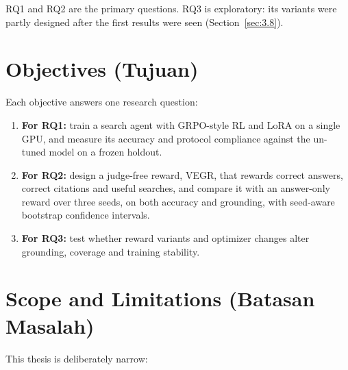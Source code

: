 RQ1 and RQ2 are the primary questions. RQ3 is exploratory: its variants
were partly designed after the first results were seen
(Section~\ref{sec:3.8}).

\section{Objectives (Tujuan)}\label{sec:1.3}

Each objective answers one research question:

\begin{enumerate}
\def\labelenumi{\arabic{enumi}.}
\tightlist
\item
  \textbf{For RQ1:} train a search agent with GRPO-style RL and LoRA on
  a single GPU, and measure its accuracy and protocol compliance against
  the un-tuned model on a frozen holdout.
\item
  \textbf{For RQ2:} design a judge-free reward, VEGR, that rewards
  correct answers, correct citations and useful searches, and compare it
  with an answer-only reward over three seeds, on both accuracy and
  grounding, with seed-aware bootstrap confidence intervals.
\item
  \textbf{For RQ3:} test whether reward variants and optimizer changes
  alter grounding, coverage and training stability.
\end{enumerate}

\section{Scope and Limitations (Batasan Masalah)}\label{sec:1.4}

This thesis is deliberately narrow:

